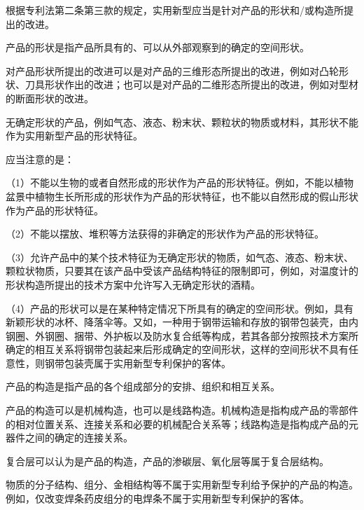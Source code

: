 根据专利法第二条第三款的规定，实用新型应当是针对产品的形状和/或构造所提出的改进。

产品的形状是指产品所具有的、可以从外部观察到的确定的空间形状。

对产品形状所提出的改进可以是对产品的三维形态所提出的改进，例如对凸轮形状、刀具形状作出的改进；也可以是对产品的二维形态所提出的改进，例如对型材的断面形状的改进。

无确定形状的产品，例如气态、液态、粉末状、颗粒状的物质或材料，其形状不能作为实用新型产品的形状特征。

应当注意的是：

{\setlength{\parindent}{17.1bp}（1）不能以生物的或者自然形成的形状作为产品的形状特征。例如，不能以植物盆景中植物生长所形成的形状作为产品的形状特征，也不能以自然形成的假山形状作为产品的形状特征。\par}

{\setlength{\parindent}{17.1bp}（2）不能以摆放、堆积等方法获得的非确定的形状作为产品的形状特征。\par}

{\setlength{\parindent}{17.1bp}（3）允许产品中的某个技术特征为无确定形状的物质，如气态、液态、粉末状、颗粒状物质，只要其在该产品中受该产品结构特征的限制即可，例如，对温度计的形状构造所提出的技术方案中允许写入无确定形状的酒精。\par}

{\setlength{\parindent}{17.1bp}（4）产品的形状可以是在某种特定情况下所具有的确定的空间形状。例如，具有新颖形状的冰杯、降落伞等。又如，一种用于钢带运输和存放的钢带包装壳，由内钢圈、外钢圈、捆带、外护板以及防水复合纸等构成，若其各部分按照技术方案所确定的相互关系将钢带包装起来后形成确定的空间形状，这样的空间形状不具有任意性，则钢带包装壳属于实用新型专利保护的客体。\par}

产品的构造是指产品的各个组成部分的安排、组织和相互关系。

产品的构造可以是机械构造，也可以是线路构造。机械构造是指构成产品的零部件的相对位置关系、连接关系和必要的机械配合关系等；线路构造是指构成产品的元器件之间的确定的连接关系。

复合层可以认为是产品的构造，产品的渗碳层、氧化层等属于复合层结构。

物质的分子结构、组分、金相结构等不属于实用新型专利给予保护的产品的构造。例如，仅改变焊条药皮组分的电焊条不属于实用新型专利保护的客体。

